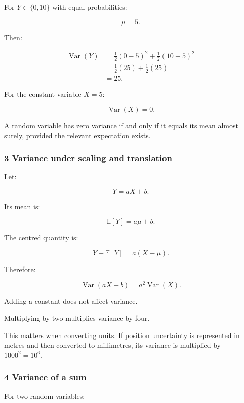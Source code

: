 For \(Y\in\{0,10\}\) with equal probabilities:

\[
 \mu=5.
\]

Then:

\[
 \begin{aligned} \operatorname{Var}(Y) &=\frac12(0-5)^2+\frac12(10-5)^2\\ &=\frac12(25)+\frac12(25)\\ &=\boxed{25}. \end{aligned}
\]

For the constant variable \(X=5\):

\[
 \operatorname{Var}(X)=0.
\]

A random variable has zero variance if and only if it equals its mean almost surely, provided the relevant expectation exists.

\subsubsection{3 Variance under scaling and translation}\label{02-foundations-ii-ch023-variance-under-scaling-and-translation}

\hypertarget{02-foundations-ii-ch023-variance-under-scaling-and-translation}{}

Let:

\[
 Y=aX+b.
\]

Its mean is:

\[
 \mathbb E[Y]=a\mu+b.
\]

The centred quantity is:

\[
 Y-\mathbb E[Y]=a(X-\mu).
\]

Therefore:

\[
 \boxed{ \operatorname{Var}(aX+b)=a^2\operatorname{Var}(X) }.
\]

Adding a constant does not affect variance.

Multiplying by two multiplies variance by four.

This matters when converting units. If position uncertainty is represented in metres and then converted to millimetres, its variance is multiplied by \(1000^2=10^6\).

\subsubsection{4 Variance of a sum}\label{02-foundations-ii-ch023-variance-of-a-sum}

\hypertarget{02-foundations-ii-ch023-variance-of-a-sum}{}

For two random variables:

